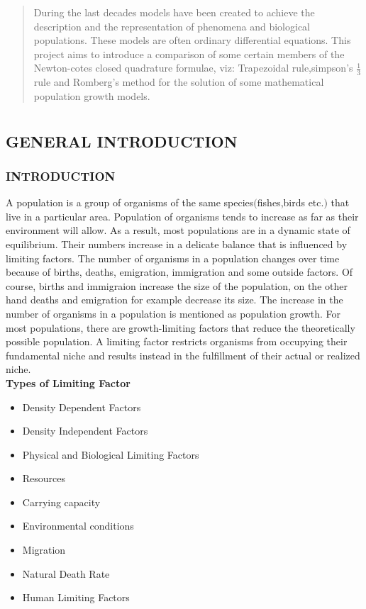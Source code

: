 \documentclass[a4paper,12pt]{report}
\numberwithin{equation}{section}
\begin{document}
	\newpage
	
	
\newpage

\begin{abstract}
During the last decades models have been created to achieve the description and the representation of phenomena and biological populations. These models are often ordinary differential equations. This project aims to introduce a comparison of some certain members of the Newton-cotes closed quadrature formulae, viz: Trapezoidal rule,simpson's $\frac{1}{3}$ rule and Romberg's method for the solution of some mathematical population growth models.
\end{abstract}

\tableofcontents
\pagestyle{empty}
\cleardoublepage

\setcounter{page}{1}
\chapter{}
\section{GENERAL INTRODUCTION}
\subsection{INTRODUCTION}
\indent A population is a group of organisms of the same species$($fishes,birds etc.$)$ that live in a particular area. Population of organisms tends to increase as far as their environment will allow. As a result, most populations are in a dynamic state of equilibrium. Their numbers increase in a delicate balance that is influenced by limiting factors. The number of organisms in a population changes over time because of births, deaths, emigration, immigration and some outside factors. Of course, births and immigraion increase the size of the population, on the other hand deaths and emigration for example decrease its size. The increase in the number of organisms in a population is mentioned as population growth. For most populations, there are growth-limiting factors that reduce the theoretically possible population. A limiting factor restricts organisms from occupying their fundamental niche and results instead in the fulfillment of their actual or realized niche.\\

\textbf{Types of Limiting Factor}
\begin{itemize}
	\item Density Dependent Factors
	\item Density Independent Factors
	\item Physical and Biological Limiting Factors
	\item Resources
	\item Carrying capacity
	\item Environmental conditions
	\item Migration
	\item Natural Death Rate
	\item Human Limiting Factors
\end{itemize}
\end{document}
